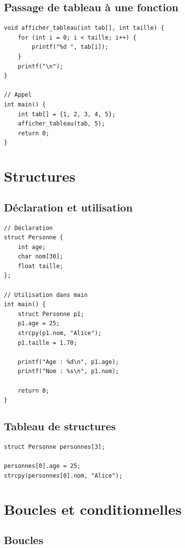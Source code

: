 \documentclass[12pt,a4paper]{article}
\begin{document}
\subsection{Passage de tableau à une fonction}

\begin{lstlisting}
void afficher_tableau(int tab[], int taille) {
    for (int i = 0; i < taille; i++) {
        printf("%d ", tab[i]);
    }
    printf("\n");
}

// Appel
int main() {
    int tab[] = {1, 2, 3, 4, 5};
    afficher_tableau(tab, 5);
    return 0;
}
\end{lstlisting}

\section{Structures}

\subsection{Déclaration et utilisation}

\begin{lstlisting}
// Déclaration
struct Personne {
    int age;
    char nom[30];
    float taille;
};

// Utilisation dans main
int main() {
    struct Personne p1;
    p1.age = 25;
    strcpy(p1.nom, "Alice");
    p1.taille = 1.70;
    
    printf("Age : %d\n", p1.age);
    printf("Nom : %s\n", p1.nom);
    
    return 0;
}
\end{lstlisting}

\subsection{Tableau de structures}

\begin{lstlisting}
struct Personne personnes[3];

personnes[0].age = 25;
strcpy(personnes[0].nom, "Alice");
\end{lstlisting}

\section{Boucles et conditionnelles}

\subsection{Boucles}
\end{document}
